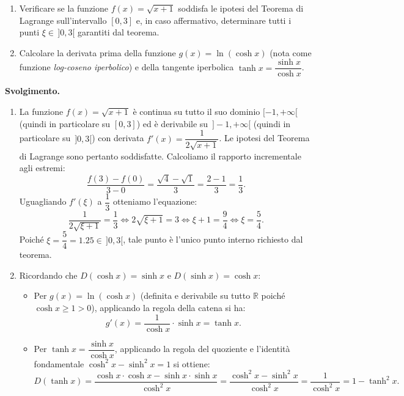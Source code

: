 \begin{esbox}
\begin{enumerate}
    \item Verificare se la funzione $f(x) = \sqrt{x + 1}$ soddisfa le ipotesi del Teorema di Lagrange sull'intervallo $[0, 3]$ e, in caso affermativo, determinare tutti i punti $\xi \in \,]0, 3[$ garantiti dal teorema.
    \item Calcolare la derivata prima della funzione $g(x) = \ln(\cosh x)$ (nota come funzione \emph{log-coseno iperbolico}) e della tangente iperbolica $\tanh x = \dfrac{\sinh x}{\cosh x}$.
\end{enumerate}

\medskip
\noindent\textbf{Svolgimento.}
\begin{enumerate}
    \item La funzione $f(x) = \sqrt{x + 1}$ è continua su tutto il suo dominio $[-1, +\infty[$ (quindi in particolare su $[0, 3]$) ed è derivabile su $\,]-1, +\infty[$ (quindi in particolare su $\,]0, 3[$) con derivata $f'(x) = \dfrac{1}{2\sqrt{x + 1}}$. Le ipotesi del Teorema di Lagrange sono pertanto soddisfatte. Calcoliamo il rapporto incrementale agli estremi:
    \[
        \frac{f(3) - f(0)}{3 - 0} = \frac{\sqrt{4} - \sqrt{1}}{3} = \frac{2 - 1}{3} = \frac{1}{3}.
    \]
    Uguagliando $f'(\xi)$ a $\dfrac{1}{3}$ otteniamo l'equazione:
    \[
        \frac{1}{2\sqrt{\xi + 1}} = \frac{1}{3} \iff 2\sqrt{\xi + 1} = 3 \iff \xi + 1 = \frac{9}{4} \iff \xi = \frac{5}{4}.
    \]
    Poiché $\xi = \dfrac{5}{4} = 1.25 \in \,]0, 3[$, tale punto è l'unico punto interno richiesto dal teorema.

    \item Ricordando che $D(\cosh x) = \sinh x$ e $D(\sinh x) = \cosh x$:
    \begin{itemize}
        \item Per $g(x) = \ln(\cosh x)$ (definita e derivabile su tutto $\mathbb{R}$ poiché $\cosh x \ge 1 > 0$), applicando la regola della catena si ha:
        \[
            g'(x) = \frac{1}{\cosh x} \cdot \sinh x = \tanh x.
        \]
        \item Per $\tanh x = \dfrac{\sinh x}{\cosh x}$, applicando la regola del quoziente e l'identità fondamentale $\cosh^2 x - \sinh^2 x = 1$ si ottiene:
        \[
            D(\tanh x) = \frac{\cosh x \cdot \cosh x - \sinh x \cdot \sinh x}{\cosh^2 x} = \frac{\cosh^2 x - \sinh^2 x}{\cosh^2 x} = \frac{1}{\cosh^2 x} = 1 - \tanh^2 x.
        \]
    \end{itemize}
\end{enumerate}
\end{esbox}

